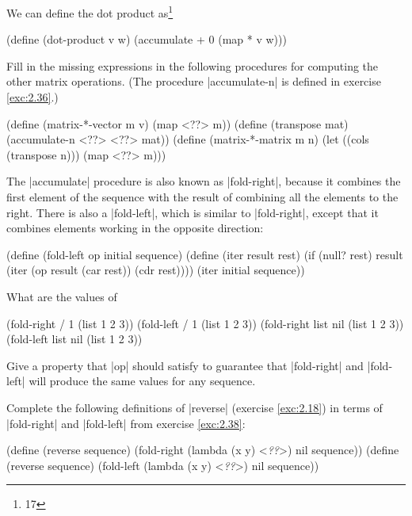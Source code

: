 \begin{Exercise}
\begin{Exercise}
\begin{schemeregion}
\begin{tabular}{ll}
  \end{tabular}
\end{schemeregion}


We can define the dot product as\footnote{17}
\begin{schemedisplay}
(define (dot-product v w)
  (accumulate + 0 (map * v w)))
\end{schemedisplay}
Fill in the missing expressions in the following procedures for
computing the other matrix operations.  (The procedure \scheme|accumulate-n| is
defined in exercise \ref{exc:2.36}.)
\begin{schemedisplay}
(define (matrix-*-vector m v)
  (map <??> m))
(define (transpose mat)
  (accumulate-n <??> <??> mat))
(define (matrix-*-matrix m n)
  (let ((cols (transpose n)))
    (map <??> m)))
\end{schemedisplay}
\end{Exercise}

\begin{Exercise}
\label{exc:2.38}
The \scheme|accumulate| procedure is also known as
\scheme|fold-right|, because it combines the first element of the
sequence with the result of combining all the elements to the right.
There is also a \scheme|fold-left|, which is similar to
\scheme|fold-right|, except that it combines elements working in the
opposite direction:
\begin{schemedisplay}
(define (fold-left op initial sequence)
  (define (iter result rest)
    (if (null? rest)
        result
        (iter (op result (car rest))
              (cdr rest))))
  (iter initial sequence))
\end{schemedisplay}
What are the values of
\begin{schemedisplay}
(fold-right / 1 (list 1 2 3))
(fold-left / 1 (list 1 2 3))
(fold-right list nil (list 1 2 3))
(fold-left list nil (list 1 2 3))
\end{schemedisplay}
Give a property that \scheme|op| should satisfy to guarantee that \scheme|fold-right| and \scheme|fold-left| will produce the same values for any
sequence.
\end{Exercise}

\begin{Exercise}
\label{exc:2.39}

Complete the following definitions of \scheme|reverse|
(exercise \ref{exc:2.18}) in terms of \scheme|fold-right| and \scheme|fold-left| from exercise \ref{exc:2.38}:
\begin{schemedisplay}
(define (reverse sequence)
  (fold-right (lambda (x y) <\textit{??}>) nil sequence))
(define (reverse sequence)
  (fold-left (lambda (x y) <\textit{??}>) nil sequence))
\end{schemedisplay}
\end{Exercise}


\end{Exercise}
